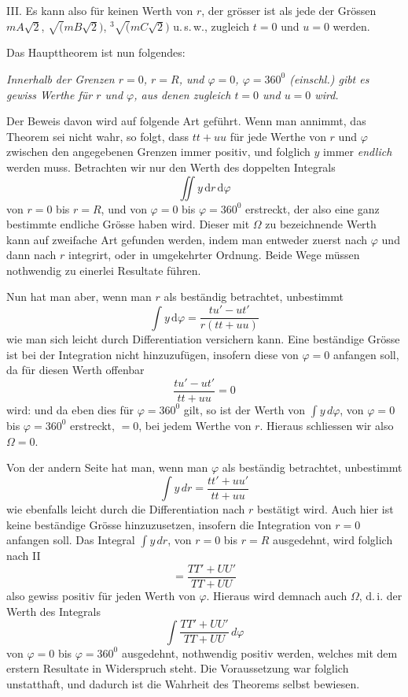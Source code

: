 III. Es kann also für keinen Werth von $r$, der grösser ist als jede
der Grössen $mA\surd2$, $\surd(mB\surd2)$, ${}^3\!\surd(mC\surd2)$
u.\,s.\,w., zugleich $t=0$ und $u=0$ werden.

Das Haupttheorem ist nun folgendes:

\emph{Innerhalb der Grenzen $r=0$, $r=R$, und $\varphi=0$,
$\varphi=360^0$ (einschl.) gibt es gewiss Werthe für $r$ und $\varphi$,
aus denen zugleich $t=0$ und $u=0$ wird.}

Der Beweis davon wird auf folgende Art geführt. Wenn man annimmt,
das Theorem sei nicht wahr, so folgt, dass $tt+uu$ für jede Werthe
von $r$ und $\varphi$ zwischen den angegebenen Grenzen immer positiv,
und folglich $y$ immer \emph{endlich} werden muss. Betrachten wir nur
den Werth des doppelten Integrals
\[
\iint y\,\mathrm{d}r\,\mathrm{d}\varphi
\]
von $r=0$ bis $r=R$, und von $\varphi=0$ bis $\varphi=360^0$
erstreckt, der also eine ganz bestimmte endliche Grösse haben wird.
Dieser mit $\Omega$ zu bezeichnende Werth kann auf zweifache Art
gefunden werden, indem man entweder zuerst nach $\varphi$ und dann
nach $r$ integrirt, oder in umgekehrter Ordnung. Beide Wege müssen
nothwendig zu einerlei Resultate führen.

Nun hat man aber, wenn man $r$ als beständig betrachtet, unbestimmt
\[
\int y\,\mathrm{d}\varphi=\frac{tu'-ut'}{r(tt+uu)}
\]
wie man sich leicht durch Differentiation versichern kann. Eine beständige Grösse
ist bei der Integration nicht hinzuzufügen, insofern diese von
$\varphi=0$ anfangen soll, da für diesen Werth offenbar
\[
\frac{tu'-ut'}{tt+uu}=0
\]
wird: und da eben dies für $\varphi=360^0$ gilt, so ist der Werth von
$\int y\,d\varphi$, von $\varphi=0$ bis $\varphi=360^0$ erstreckt, $=0$,
bei jedem Werthe von $r$. Hieraus schliessen wir also $\Omega=0$.

Von der andern Seite hat man, wenn man $\varphi$ als beständig betrachtet,
unbestimmt
\[
\int y\,dr=\frac{tt'+uu'}{tt+uu}
\]
wie ebenfalls leicht durch die Differentiation nach $r$ bestätigt wird.
Auch hier ist keine beständige Grösse hinzuzusetzen, insofern die Integration
von $r=0$ anfangen soll. Das Integral $\int y\,dr$, von $r=0$ bis $r=R$
ausgedehnt, wird folglich nach II
\[
=\frac{TT'+UU'}{TT+UU}
\]
also gewiss positiv für jeden Werth von $\varphi$. Hieraus wird demnach
auch $\Omega$, d.\,i. der Werth des Integrals
\[
\int\frac{TT'+UU'}{TT+UU}\,d\varphi
\]
von $\varphi=0$ bis $\varphi=360^0$ ausgedehnt, nothwendig positiv werden,
welches mit dem erstern Resultate in Widerspruch steht. Die Voraussetzung
war folglich unstatthaft, und dadurch ist die Wahrheit des Theorems selbst
bewiesen.


